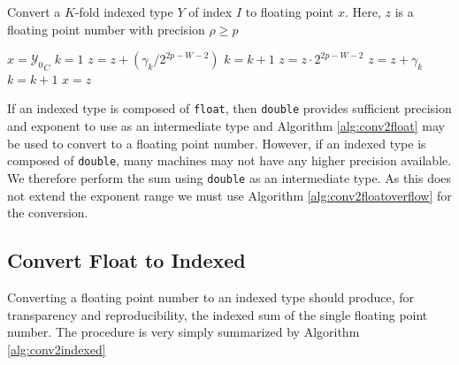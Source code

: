     \begin{samepage}
    \begin{alg}
      Convert a $K$-fold indexed type $Y$ of index $I$ to floating point $x$.
      Here, $z$ is a floating point number with precision $\rho \geq p$
      \begin{algorithmic}[1]
            \State $x = {\mathcal{Y}_0}_C$
            \State \Return
          \EndIf
          \State $k = 1$
            \State $z = z + (\gamma_k / 2^{2 p - W - 2})$
            \State $k = k + 1$
          \EndWhile
          \State $z = z \cdot 2^{2 p - W - 2}$
            \State $z = z + \gamma_k$
            \State $k = k + 1$
          \EndWhile
          \State $x = z$
        \EndFunction
      \end{algorithmic}
      \label{alg:conv2floatoverflow}
    \end{alg}
    \end{samepage}

    If an indexed type is composed of \texttt{float}, then \texttt{double}
    provides sufficient precision and exponent to use as an intermediate type
    and Algorithm \ref{alg:conv2float} may be used to convert to a floating
    point number.  However, if an indexed type is composed of \texttt{double},
    many machines may not have any higher precision available. We therefore
    perform the sum using \texttt{double} as an intermediate type. As this does
    not extend the exponent range we must use Algorithm
    \ref{alg:conv2floatoverflow} for the conversion.

\subsection{Convert Float to Indexed}
    Converting a floating point number to an indexed type should produce, for
    transparency and reproducibility, the indexed sum of the single floating
    point number.
    The procedure is very simply summarized by Algorithm \ref{alg:conv2indexed}

